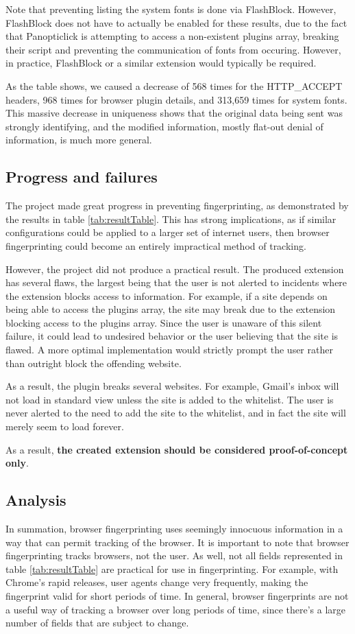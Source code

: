 \documentclass[12pt,a4paper]{article}
\begin{document}
Note that preventing listing the system fonts is done via FlashBlock. However, FlashBlock does not have to actually be enabled for these results, due to the fact that Panopticlick is attempting to access a non-existent plugins array, breaking their script and preventing the communication of fonts from occuring. However, in practice, FlashBlock or a similar extension would typically be required.

As the table shows, we caused a decrease of 568 times for the HTTP\_ACCEPT headers, 968 times for browser plugin details, and 313,659 times for system fonts. This massive decrease in uniqueness shows that the original data being sent was strongly identifying, and the modified information, mostly flat-out denial of information, is much more general.

\subsection{Progress and failures}
The project made great progress in preventing fingerprinting, as demonstrated by the results in table \ref{tab:resultTable}. This has strong implications, as if similar configurations could be applied to a larger set of internet users, then browser fingerprinting could become an entirely impractical method of tracking.

However, the project did not produce a practical result. The produced extension has several flaws, the largest being that the user is not alerted to incidents where the extension blocks access to information. For example, if a site depends on being able to access the plugins array, the site may break due to the extension blocking access to the plugins array. Since the user is unaware of this silent failure, it could lead to undesired behavior or the user believing that the site is flawed. A more optimal implementation would strictly prompt the user rather than outright block the offending website.

As a result, the plugin breaks several websites. For example, Gmail's inbox will not load in standard view unless the site is added to the whitelist. The user is never alerted to the need to add the site to the whitelist, and in fact the site will merely seem to load forever.

As a result, \textbf{the created extension should be considered proof-of-concept only}.

\subsection{Analysis}
In summation, browser fingerprinting uses seemingly innocuous information in a way that can permit tracking of the browser. It is important to note that browser fingerprinting tracks browsers, not the user. As well, not all fields represented in table \ref{tab:resultTable} are practical for use in fingerprinting. For example, with Chrome's rapid releases, user agents change very frequently, making the fingerprint valid for short periods of time. In general, browser fingerprints are not a useful way of tracking a browser over long periods of time, since there's a large number of fields that are subject to change.
\end{document}
